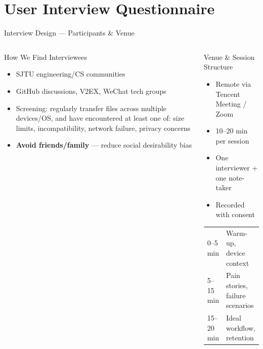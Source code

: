 \documentclass[xcolor=table,dvipsnames,svgnames,aspectratio=169]{beamer}
\begin{document}
\section{User Interview Questionnaire}

\begin{frame}[shrink=8]{Interview Design --- Participants \& Venue}
  \begin{columns}[t]
    \begin{block}{How We Find Interviewees}
      \begin{itemize}
        \item SJTU engineering/CS communities
        \item GitHub discussions, V2EX, WeChat tech groups
        \item Screening: regularly transfer files across multiple devices/OS, and have encountered at least one of: size limits, incompatibility, network failure, privacy concerns
        \item \textbf{Avoid friends/family} --- reduce social desirability bias
      \end{itemize}
    \end{block}
    \begin{block}{Venue \& Session Structure}
      \begin{itemize}
        \item Remote via Tencent Meeting / Zoom
        \item 10--20 min per session
        \item One interviewer + one note-taker
        \item Recorded with consent
      \end{itemize}
      \vspace{0.5em}
      \begin{tabular}{ll}
        0--5 min  & Warm-up, device context \\
        5--15 min & Pain stories, failure scenarios \\
        15--20 min & Ideal workflow, retention \\
      \end{tabular}
    \end{block}
  \end{columns}
\end{frame}
\end{document}
